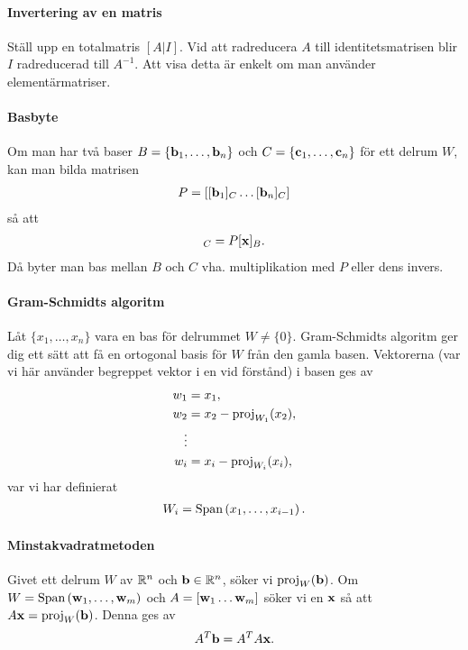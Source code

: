 \paragraph{Invertering av en matris}
Ställ upp en totalmatris $[A | I]$. Vid att radreducera $A$ till identitetsmatrisen blir $I$ radreducerad till $A^{-1}$. Att visa detta är enkelt om man använder elementärmatriser.

\paragraph{Basbyte}
Om man har två baser $B = \{\vect{b}_1, \dots, \vect{b}_n\}$ och $C = \{\vect{c}_1, \dots, \vect{c}_n\}$ för ett delrum $W$, kan man bilda matrisen
\begin{align*}
	P = [[\vect{b}_1]_C \dots [\vect{b}_n]_C]
\end{align*}
så att
\begin{align*}
	[\vect{x}]_C = P[\vect{x}]_B.
\end{align*}
Då byter man bas mellan $B$ och $C$ vha. multiplikation med $P$ eller dens invers.

\paragraph{Gram-Schmidts algoritm}
Låt $\{x_1, \dots, x_n\}$ vara en bas för delrummet $W\neq\{0\}$. Gram-Schmidts algoritm ger dig ett sätt att få en ortogonal basis för $W$ från den gamla basen. Vektorerna (var vi här använder begreppet vektor i en vid förstånd) i basen ges av
\begin{align*}
	w_1 &= x_1, \\
	w_2 &= x_2 - \text{proj}_{W_1}(x_2), \\
	\vdots \\
	w_i &= x_i - \text{proj}_{W_i}(x_i),
\end{align*}
var vi har definierat
\begin{align*}
	W_i = \text{Span}\left(x_1, \dots, x_{i - 1}\right).
\end{align*}

\paragraph{Minstakvadratmetoden}
Givet ett delrum $W$ av $\mathbb{R}^n$ och $\vect{b}\in\R^n$, söker vi $\proj{W}{\vect{b}}$. Om $W=\Span{\vect{w}_1, \dots, \vect{w}_m}$ och $A = [\vect{w}_1 \dots \vect{w}_m]$ söker vi en $\vect{x}$ så att $A\vect{x} = \proj{W}{\vect{b}}$. Denna ges av 
\begin{align*}
	A^T\vect{b} = A^TA\vect{x}.
\end{align*}

